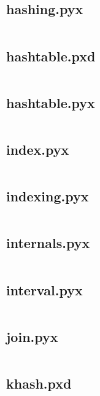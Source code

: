 \documentclass{article}
\begin{document}
\subsection{hashing.pyx}
\inputminted{cython}{/home/dufferzafar/dev/@clones/pandas/pandas/_libs/hashing.pyx}
\newpage

\subsection{hashtable.pxd}
\inputminted{cython}{/home/dufferzafar/dev/@clones/pandas/pandas/_libs/hashtable.pxd}
\newpage

\subsection{hashtable.pyx}
\inputminted{cython}{/home/dufferzafar/dev/@clones/pandas/pandas/_libs/hashtable.pyx}
\newpage

\subsection{index.pyx}
\inputminted{cython}{/home/dufferzafar/dev/@clones/pandas/pandas/_libs/index.pyx}
\newpage

\subsection{indexing.pyx}
\inputminted{cython}{/home/dufferzafar/dev/@clones/pandas/pandas/_libs/indexing.pyx}
\newpage

\subsection{internals.pyx}
\inputminted{cython}{/home/dufferzafar/dev/@clones/pandas/pandas/_libs/internals.pyx}
\newpage

\subsection{interval.pyx}
\inputminted{cython}{/home/dufferzafar/dev/@clones/pandas/pandas/_libs/interval.pyx}
\newpage

\subsection{join.pyx}
\inputminted{cython}{/home/dufferzafar/dev/@clones/pandas/pandas/_libs/join.pyx}
\newpage

\subsection{khash.pxd}
\inputminted{cython}{/home/dufferzafar/dev/@clones/pandas/pandas/_libs/khash.pxd}
\newpage
\end{document}
